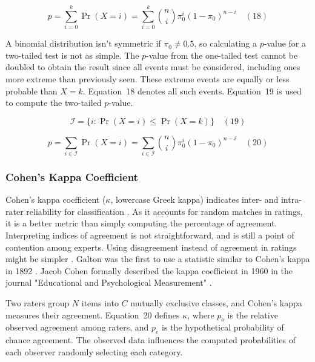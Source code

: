 \documentclass[sn-mathphys-num]{sn-jnl}%
\begin{document}
\begin{equation}
	p=\sum_{i=0}^{k}\Pr(X=i)=\sum_{i=0}^{k}{\binom{n}{i}}\pi_{0}^{i}(1-\pi_{0})^{n-i}
	\quad\left(18\right)
\end{equation}

A binomial distribution isn't symmetric if $\pi_{0}\neq 0.5$, so calculating a $p$-value for a two-tailed test is not as simple. The $p$-value from the one-tailed test cannot be doubled to obtain the result since all events must be considered, including ones more extreme than previously seen. These extreme events are equally or less probable than $X=k$. Equation~18 denotes all such events. Equation~19 is used to compute the two-tailed $p$-value.

\begin{equation}
	{\mathcal{I}}=\{i\colon \Pr(X=i)\leq \Pr(X=k)\}
	\quad\left(19\right)
\end{equation}

\begin{equation}
	p=\sum_{i\in {\mathcal{I}}}\Pr(X=i)=\sum_{i\in {\mathcal{I}}}{\binom{n}{i}}\pi_{0}^{i}(1-\pi_{0})^{n-i}
	\quad\left(20\right)
\end{equation}

\subsubsection{Cohen's Kappa Coefficient}

Cohen's kappa coefficient ($\kappa$, lowercase Greek kappa) indicates inter- and intra-rater reliability for classification \cite{mchugh2012interrater}. As it accounts for random matches in ratings, it is a better metric than simply computing the percentage of agreement. Interpreting indices of agreement is not straightforward, and is still a point of contention among experts. Using disagreement instead of agreement in ratings might be simpler \cite{pontius2011death}. Galton was the first to use a statistic similar to Cohen's kappa in 1892 \cite{galton1892finger, smeeton1985early}. Jacob Cohen formally described the kappa coefficient in 1960 in the journal "Educational and Psychological Measurement" \cite{cohen1960coefficient}.

Two raters group $N$ items into $C$ mutually exclusive classes, and Cohen's kappa measures their agreement. Equation~20 defines $\kappa$, where $p_{o}$ is the relative observed agreement among raters, and $p_{e}$ is the hypothetical probability of chance agreement. The observed data influences the computed probabilities of each observer randomly selecting each category.
\end{document}
